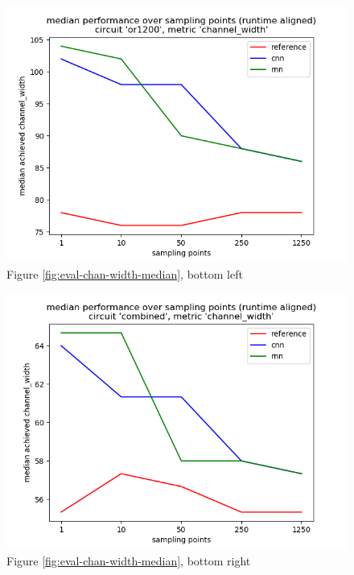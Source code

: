 \begin{figure}[H]
	\includegraphics[width=\linewidth]{plots/eval-or1200-chan-width-median-full.png}
	\caption{Figure \ref{fig:eval-chan-width-median}, bottom left}
\end{figure}

\begin{figure}[H]
	\includegraphics[width=\linewidth]{plots/eval-combined-chan-width-median-full.png}
	\caption{Figure \ref{fig:eval-chan-width-median}, bottom right}
\end{figure}

